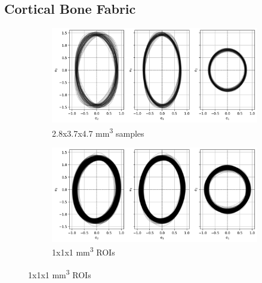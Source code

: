 \documentclass[a4paper,fleqn]{DC_ArtStyle}
\begin{document}
	\subsection{Cortical Bone Fabric}
	\begin{figure}
		\begin{subfigure}[b]{\linewidth}
			\includegraphics[width=\linewidth]{SamplesFabric}
			\caption{2.8x3.7x4.7 mm\textsuperscript{3} samples}
		\end{subfigure}
		\begin{subfigure}[b]{\linewidth}
			\includegraphics[width=\linewidth]{ROIsFabric}
			\caption{1x1x1 mm\textsuperscript{3} ROIs}
		\end{subfigure}
	\end{figure}
	
	\clearpage
\end{document}
